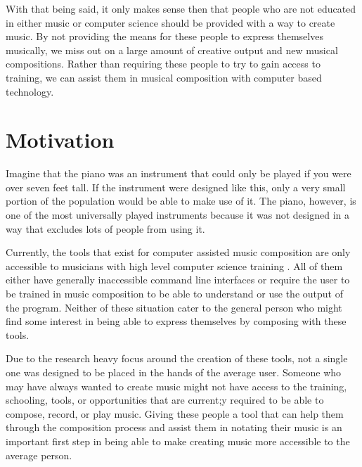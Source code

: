 \vspace{\baselineskip}

With that being said, it only makes sense then that people who are not educated in either music or computer science should be provided with a way to create music.  By not providing the means for these people to express themselves musically, we miss out on a large amount of creative output and new musical compositions.  Rather than requiring these people to try to gain access to training, we can assist them in musical composition with computer based technology.

\section{Motivation} 
\label{sec:motivation}

Imagine that the piano was an instrument that could only be played if you were over seven feet tall.  If the instrument were designed like this, only a very small portion of the population would be able to make use of it.  The piano, however, is one of the most universally played instruments because it was not designed in a way that excludes lots of people from using it.

\vspace{\baselineskip}

Currently, the tools that exist for computer assisted music composition are only accessible to musicians with high level computer science training \cite{Teymuri_2019}.  All of them either have generally inaccessible command line interfaces or require the user to be trained in music composition to be able to understand or use the output of the program.  Neither of these situation cater to the general person who might find some interest in being able to express themselves by composing with these tools.

\vspace{\baselineskip}

Due to the research heavy focus around the creation of these tools, not a single one was designed to be placed in the hands of the average user.  Someone who may have always wanted to create music might not have access to the training, schooling, tools, or opportunities that are current;y required to be able to compose, record, or play music.  Giving these people a tool that can help them through the composition process and assist them in notating their music is an important first step in being able to make creating music more accessible to the average person.

